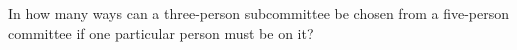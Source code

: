 In how many ways can a three-person subcommittee be chosen from a five-person committee if one particular person must be on it?
